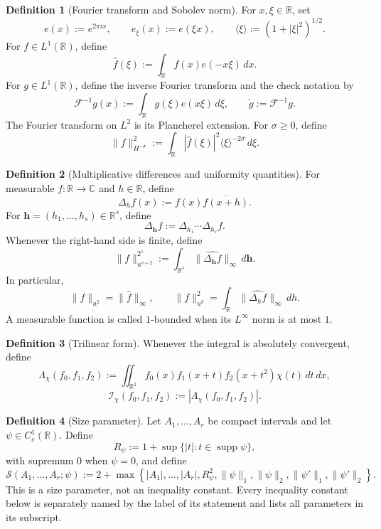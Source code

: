 \documentclass[11pt]{article}
\theoremstyle{definition}
\newtheorem{definition}[definition]{Definition}
\theoremstyle{remark}
\newcommand{\R}{\mathbb R}
\newcommand{\C}{\mathbb C}
\newcommand{\supp}{\operatorname{supp}}
\newcommand{\1}{\mathbf 1}
\newcommand{\FT}[1]{\widehat{#1}}
\newcommand{\br}[1]{\langle #1\rangle}
\newcommand{\dd}{\,d}
\newcommand{\Ichi}{\mathcal I_{\chi}}
\newcommand{\Lamchi}{\Lambda_{\chi}}
\newcommand{\uNorm}[2]{\lVert #1\rVert_{u^{#2}}}
\newcommand{\hNorm}[2]{\lVert #1\rVert_{H^{#2}}}
\newcommand{\lpNorm}[2]{\lVert #1\rVert_{#2}}
\newcommand{\Ssize}[2]{\mathcal S\!\left(#1;#2\right)}
\begin{document}
\begin{definition}[Fourier transform and Sobolev norm]\label{def:fourier-sobolev}
For $x,\xi\in\R$, set
\[
e(x):=e^{2\pi ix},
\qquad
e_\xi(x):=e(\xi x),
\qquad
\br\xi:=(1+|\xi|^2)^{1/2}.
\]
For $f\in L^1(\R)$, define
\[
\FT f(\xi):=\int_\R f(x)e(-x\xi)\dd x.
\]
For $g\in L^1(\R)$, define the inverse Fourier transform and the check notation by
\[
\mathcal F^{-1}g(x):=\int_\R g(\xi)e(x\xi)\dd\xi,
\qquad
\check g:=\mathcal F^{-1}g.
\]
The Fourier transform on $L^2$ is its Plancherel extension.  For $\sigma\geq0$, define
\[
\hNorm f{-\sigma}^2
:=\int_\R|\FT f(\xi)|^2\br\xi^{-2\sigma}\dd\xi.
\]
\end{definition}

\begin{definition}[Multiplicative differences and uniformity quantities]\label{def:uniformity}
For measurable $f:\R\to\C$ and $h\in\R$, define
\[
\Delta_hf(x):=f(x)\overline{f(x+h)}.
\]
For $\mathbf h=(h_1,\ldots,h_s)\in\R^s$, define
\[
\Delta_{\mathbf h}f:=\Delta_{h_1}\cdots\Delta_{h_s}f.
\]
Whenever the right-hand side is finite, define
\[
\uNorm f{s+2}^{2^s}
:=\int_{\R^s}\lpNorm{\FT{\Delta_{\mathbf h}f}}\infty\dd\mathbf h.
\]
In particular,
\[
\uNorm f2=\lpNorm{\FT f}\infty,
\qquad
\uNorm f3^2=\int_\R\lpNorm{\FT{\Delta_hf}}\infty\dd h.
\]
A measurable function is called $1$-bounded when its $L^\infty$ norm is at most $1$.
\end{definition}

\begin{definition}[Trilinear form]\label{def:trilinear-form}
Whenever the integral is absolutely convergent, define
\[
\Lamchi(f_0,f_1,f_2)
:=\iint_{\R^2}f_0(x)f_1(x+t)f_2(x+t^2)\chi(t)\dd t\dd x,
\]
\[
\Ichi(f_0,f_1,f_2):=|\Lamchi(f_0,f_1,f_2)|.
\]
\end{definition}

\begin{definition}[Size parameter]\label{def:size-parameter}
Let $A_1,\ldots,A_r$ be compact intervals and let $\psi\in C_c^1(\R)$.  Define
\[
R_\psi:=1+\sup\{|t|:t\in\supp\psi\},
\]
with supremum $0$ when $\psi=0$, and define
\[
\Ssize{A_1,\ldots,A_r}{\psi}
:=
2+
\max\left\{
\lvert A_1\rvert,\ldots,\lvert A_r\rvert,R_\psi^2,
\lpNorm\psi1,\lpNorm\psi2,
\lpNorm{\psi'}1,\lpNorm{\psi'}2
\right\}.
\]
This is a size parameter, not an inequality constant.  Every inequality constant below is separately named by the label of its statement and lists all parameters in its subscript.
\end{definition}
\end{document}
